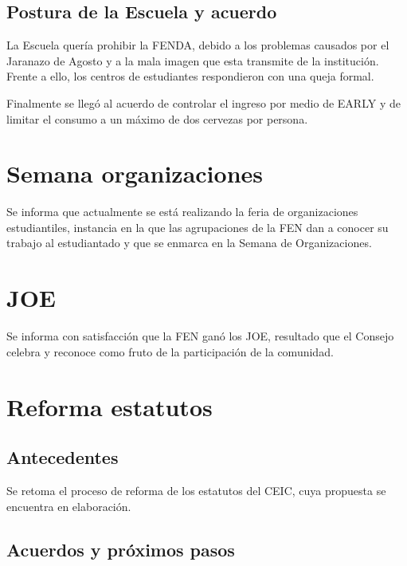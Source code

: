 \documentclass[12pt,letterpaper]{article}
\begin{document}
\subsection{Postura de la Escuela y acuerdo}

La Escuela quería prohibir la FENDA, debido a los problemas causados por el Jaranazo de Agosto y a la mala imagen que esta transmite de la institución. Frente a ello, los centros de estudiantes respondieron con una queja formal.

Finalmente se llegó al acuerdo de controlar el ingreso por medio de EARLY y de limitar el consumo a un máximo de dos cervezas por persona.

\section{Semana organizaciones}

Se informa que actualmente se está realizando la feria de organizaciones estudiantiles, instancia en la que las agrupaciones de la FEN dan a conocer su trabajo al estudiantado y que se enmarca en la Semana de Organizaciones.

\section{JOE}

Se informa con satisfacción que la FEN ganó los JOE, resultado que el Consejo celebra y reconoce como fruto de la participación de la comunidad.

\section{Reforma estatutos}

\subsection{Antecedentes}

Se retoma el proceso de reforma de los estatutos del CEIC, cuya propuesta se encuentra en elaboración.

\subsection{Acuerdos y próximos pasos}
\end{document}
